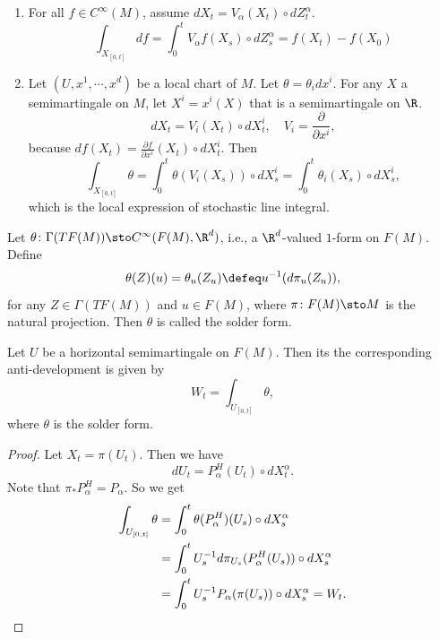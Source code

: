 \begin{exam}
    \begin{enumerate}[label=(\arabic{*})]
        \item  For all $f \in C^\infty(M)$, assume $dX_t = V_\alpha(X_t) \circ dZ_t^\alpha$.
        \begin{equation*}
            \int_{X_{[0,t]}} df = \int_0^t V_\alpha f(X_s) \circ dZ^\alpha_s = f(X_t) - f(X_0)
        \end{equation*}
        
        \item Let $(U,x^1,\cdots,x^d)$ be a local chart of $M$. Let $\theta = \theta_i dx^i$. For any $X$ a semimartingale on $M$, let $X^i = x^i(X)$ that is a semimartingale on $\R$.
        \begin{equation*}
            dX_t = V_i(X_t) \circ dX^i_t,\quad V_i = \frac{\partial}{\partial x^i},
        \end{equation*}
        because $df(X_t) = \frac{\partial f}{\partial x^i}(X_t) \circ dX^i_t$. Then
        \begin{equation*}
            \int_{X_{[0,t]}} \theta = \int_0^t \theta(V_i(X_s)) \circ dX^i_s = \int_0^t \theta_i(X_s)\circ dX^i_s,
        \end{equation*}
        which is the local expression of stochastic line integral.
    \end{enumerate}  
\end{exam}

\begin{defn}
    Let $\theta \colon \Gamma(TF(M)) \sto C^\infty(F(M),\R^d)$, i.e., a $\R^d$-valued $1$-form on $F(M)$. Define
    \begin{equation*}
        \theta(Z)(u) = \theta_u(Z_u) \defeq u^{-1}(d\pi_u (Z_u)),
    \end{equation*}
    for any $Z \in \Gamma(TF(M))$ and $u \in F(M)$, where $\pi \colon F(M) \sto M$ is the natural projection. Then $\theta$ is called the solder form.
\end{defn}

\begin{prop}
    Let $U$ be a horizontal semimartingale on $F(M)$. Then its the corresponding anti-development is given by
    \begin{equation*}
        W_t = \int_{U_{[0,t]}} \theta,
    \end{equation*}
    where $\theta$ is the solder form.
\end{prop}
\begin{proof}
    Let $X_t = \pi(U_t)$. Then we have
    \begin{equation*}
        dU_t = P^H_\alpha(U_t) \circ dX^\alpha_t.
    \end{equation*}
    Note that $\pi_* P^H_\alpha = P_\alpha$. So we get
    \begin{align*}
        \int_{U_{[0,t]}} \theta &= \int_0^t \theta(P^H_\alpha)(U_s) \circ dX^\alpha_s \\
        &= \int_0^t U_s^{-1}d\pi_{U_s}(P_\alpha^H(U_s)) \circ dX^\alpha_s \\
        &= \int_0^t U_s^{-1}P_\alpha(\pi(U_s)) \circ dX^\alpha_s = W_t. \qedhere
    \end{align*}
\end{proof}

